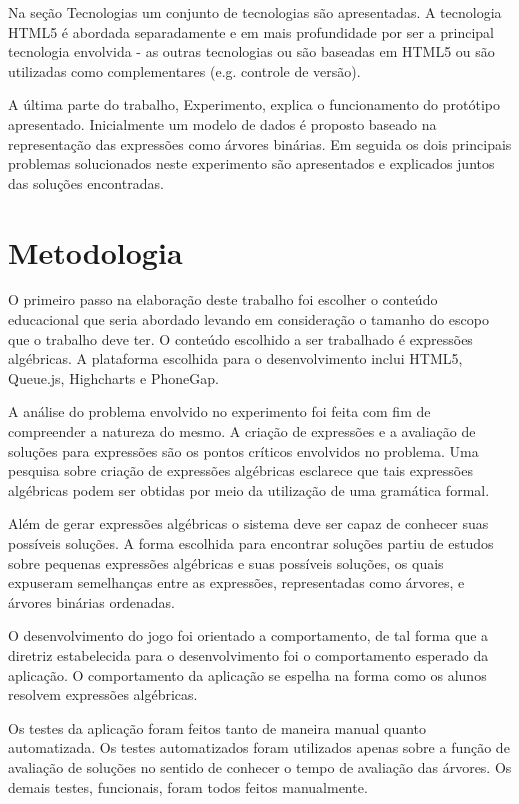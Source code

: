 Na seção Tecnologias um conjunto de tecnologias são apresentadas. A tecnologia HTML5 é abordada separadamente e em mais profundidade por ser a principal tecnologia envolvida - as outras tecnologias ou são baseadas em HTML5 ou são utilizadas como complementares (e.g. controle de versão).

A última parte do trabalho, Experimento, explica o funcionamento do protótipo apresentado. Inicialmente um modelo de dados é proposto baseado na representação das expressões como árvores binárias. Em seguida os dois principais problemas solucionados neste experimento são apresentados e explicados juntos das soluções encontradas.
		
\section{Metodologia}
O primeiro passo na elaboração deste trabalho foi escolher o conteúdo educacional que seria abordado levando em consideração o tamanho do escopo que o trabalho deve ter. O conteúdo escolhido a ser trabalhado é expressões algébricas. A plataforma escolhida para o desenvolvimento inclui HTML5, Queue.js, Highcharts e PhoneGap.
	
	A análise do problema envolvido no experimento foi feita com fim de compreender a natureza do mesmo. A criação de expressões e a avaliação de soluções para expressões são os pontos críticos envolvidos no problema. Uma pesquisa sobre criação de expressões algébricas esclarece que tais expressões algébricas podem ser obtidas por meio da utilização de uma gramática formal.
	
	Além de gerar expressões algébricas o sistema deve ser capaz de conhecer suas possíveis soluções. A forma escolhida para encontrar soluções partiu de estudos sobre pequenas expressões algébricas e suas possíveis soluções, os quais expuseram semelhanças entre as expressões, representadas como árvores, e árvores binárias ordenadas.
	
	O desenvolvimento do jogo foi orientado a comportamento, de tal forma que a diretriz estabelecida para o desenvolvimento foi o comportamento esperado da aplicação. O comportamento da aplicação se espelha na forma como os alunos resolvem expressões algébricas.
	
	Os testes da aplicação foram feitos tanto de maneira manual quanto automatizada. Os testes automatizados foram utilizados apenas sobre a função de avaliação de soluções no sentido de conhecer o tempo de avaliação das árvores. Os demais testes, funcionais, foram todos feitos manualmente.

